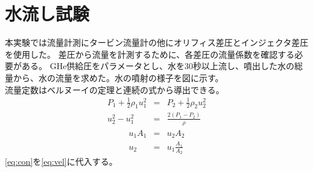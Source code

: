 \section{水流し試験}
本実験では流量計測にタービン流量計の他にオリフィス差圧とインジェクタ差圧を使用した。
差圧から流量を計測するために、各差圧の流量係数を確認する必要がある。
GHe供給圧をパラメータとし、水を30秒以上流し、噴出した水の総量から、水の流量を求めた。水の噴射の様子を図に示す。
\\
流量定数はベルヌーイの定理と連続の式から導出できる。
\begin{eqnarray}
P_{1} + \frac{1}{2} \rho_{1} u^2_{1} &=& P_{2} + \frac{1}{2} \rho_{2} u^2_{2}  \nonumber \\
u^2_{2} - u^2_{1} &=& \frac{2(P_{1}-P_{2})}{\rho} 
\label{eq:vel}
\end{eqnarray}
\begin{eqnarray}
u_{1}A_{1} &=& u_{2}A_{2}  \nonumber \\
u_{2} &=& u_{1}\frac{A_{1}}{A_{2}}
\label{eq:con}
\end{eqnarray}
\ref{eq:con}を\ref{eq:vel}に代入する。

